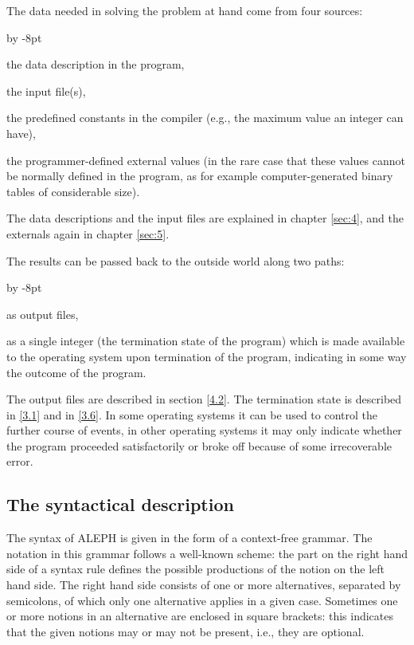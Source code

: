 \documentclass{article}
\newcommand\A{{\sf ALEPH}}
\renewenvironment{itemize}{\begin{list}{}{%
\advance\leftmargin by -8pt%
\setlength\itemsep{0ex plus 0.2ex}%
\setlength\partopsep{3pt}%
\setlength\topsep{2pt plus 2pt}%
\setlength\parsep{0pt plus 2pt}%
}}{\end{list}}
\begin{document}
The data needed in solving the problem at hand come from four sources:
\begin{itemize}
\item[a.] the data description in the program,
\item[b.] the input file(s),
\item[c.] the predefined constants in the compiler (e.g., the maximum value
an integer can have),
\item[d.] the programmer-defined external values (in the rare case that
these values cannot be normally defined in the program, as for example
computer-generated binary tables of considerable size).
\end{itemize}

The data descriptions and the input files are explained in chapter
\ref{sec:4}, and the
externals again in chapter \ref{sec:5}.

The results can be passed back to the outside world along two paths:
\begin{itemize}
\item[a.] as output files,
\item[b.] as a single integer (the termination state of the program) which is
made available to the operating system upon termination of the program, indicating
in some way the outcome of the program.
\end{itemize}

The output files are described in section \ref{4.2}. The termination state is
described in \ref{3.1} and in \ref{3.6}. In some operating systems it can be used to
control the further course of events, in other operating systems it may only
indicate whether the program proceeded satisfactorily or broke off because
of some irrecoverable error.

\subsection{The syntactical description}\label{2.2}

The syntax of \A{} is given in the form of a context-free grammar. The
notation in this grammar follows a well-known scheme: the part on the right
hand side of a syntax rule defines the possible productions of the notion on
the left hand side. The right hand side consists of one or more
alternatives, separated by semicolons, of which only one alternative applies
in a given case. Sometimes one or more notions in an alternative are
enclosed in square brackets: this indicates that the given notions may or
may not be present, i.e., they are optional.
\end{document}
